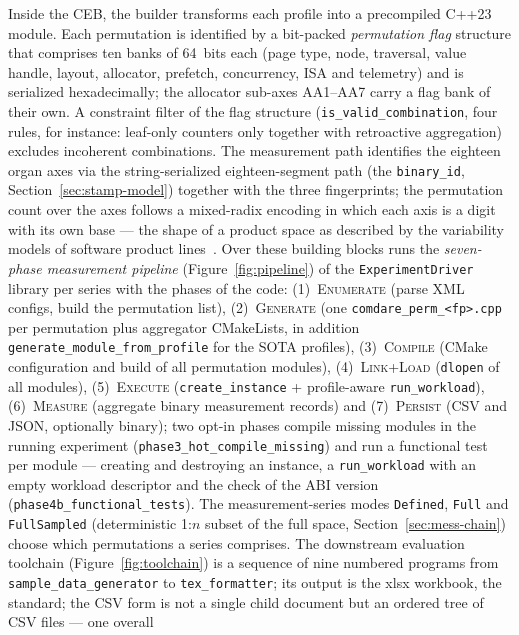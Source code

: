 \begin{nurlang}
Inside the CEB, the builder transforms each profile into a precompiled C++23 module. Each permutation
is identified by a bit-packed \emph{permutation flag} structure that comprises ten banks of 64~bits
each (page type, node, traversal, value handle, layout, allocator, prefetch, concurrency, ISA and
telemetry) and is serialized hexadecimally; the allocator sub-axes AA1--AA7 carry a flag bank of their
own. A constraint filter of the flag structure (\texttt{is\_valid\_combination}, four rules, for
instance: leaf-only counters only together with retroactive aggregation) excludes incoherent
combinations. The measurement path identifies the eighteen organ axes via the string-serialized
eighteen-segment path (the \texttt{binary\_id}, Section~\ref{sec:stamp-model}) together with the three
fingerprints; the permutation count over the axes follows a mixed-radix encoding in which each axis is
a digit with its own base --- the shape of a product space as described by the variability models of
software product lines~\cite{pohl2005spl}. Over these building blocks runs the
\emph{seven-phase measurement pipeline} (Figure~\ref{fig:pipeline}) of the \texttt{ExperimentDriver}
library per series with the phases of the code: (1)~\textsc{Enumerate} (parse XML configs, build the
permutation list), (2)~\textsc{Generate} (one \texttt{comdare\_perm\_<fp>.cpp} per permutation plus
aggregator CMakeLists, in addition
\texttt{generate\_\allowbreak{}module\_\allowbreak{}from\_\allowbreak{}profile} for the SOTA profiles),
(3)~\textsc{Compile} (CMake configuration and build of all permutation modules),
(4)~\textsc{Link+Load} (\texttt{dlopen} of all modules), (5)~\textsc{Execute} (\texttt{create\_instance}
+ profile-aware \texttt{run\_workload}), (6)~\textsc{Measure} (aggregate binary measurement records)
and (7)~\textsc{Persist} (CSV and JSON, optionally binary); two opt-in phases compile missing modules
in the running experiment (\texttt{phase3\_hot\_compile\_missing}) and run a functional test per module
--- creating and destroying an instance, a \texttt{run\_workload} with an empty workload descriptor and
the check of the ABI version (\texttt{phase4b\_functional\_tests}). The measurement-series modes
\texttt{Defined}, \texttt{Full} and \texttt{FullSampled} (deterministic 1:$n$ subset of the full space,
Section~\ref{sec:mess-chain}) choose which permutations a series comprises. The downstream evaluation
toolchain (Figure~\ref{fig:toolchain}) is a sequence of nine numbered programs from
\texttt{sample\_data\_generator} to \texttt{tex\_formatter}; its output is the xlsx workbook, the
standard; the CSV form is not a single child document but an ordered tree of CSV files --- one overall

\end{nurlang}
